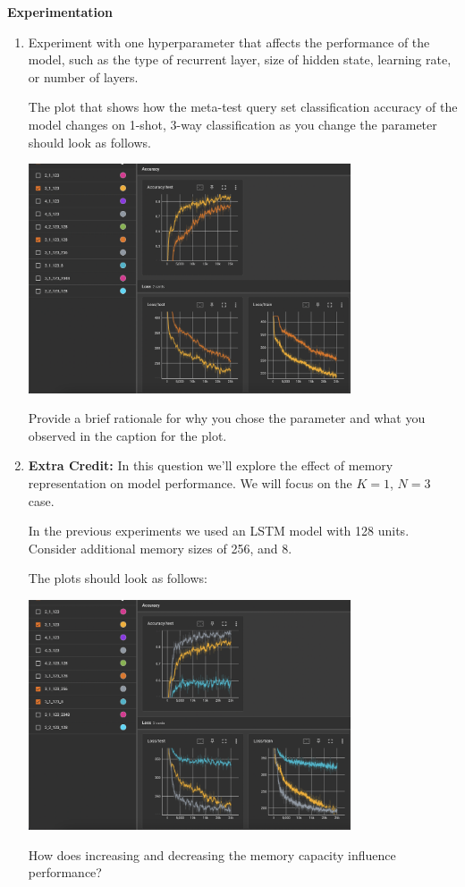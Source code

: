 \item {} {\bf Experimentation}

\begin{enumerate}[label=\alph*]
    \item Experiment with one hyperparameter that affects the performance of the model, such as the type of recurrent layer, size of hidden state, learning rate, or number of layers. 
    
    The plot that shows how the meta-test query set classification accuracy of the model changes on 1-shot, 3-way classification as you change the parameter should look as follows.

    \begin{center}
        \includegraphics[width = 0.75\textwidth]{./figures/soln4i}
    \end{center}
    
    Provide a brief rationale for why you chose the parameter and what you observed in the caption for the plot.    
    
    \item \textbf{Extra Credit:} In this question we'll explore the effect of memory representation on model performance. We will focus on the $K=1$, $N=3$ case.
    
    In the previous experiments we used an LSTM model with 128 units. Consider additional memory sizes of 256, and 8. 
    
    The plots should look as follows:
    \begin{center}
        \includegraphics[width = 0.75\textwidth]{./figures/soln4ii}
    \end{center}
    
    How does increasing and decreasing the memory capacity influence performance?
        
\end{enumerate}